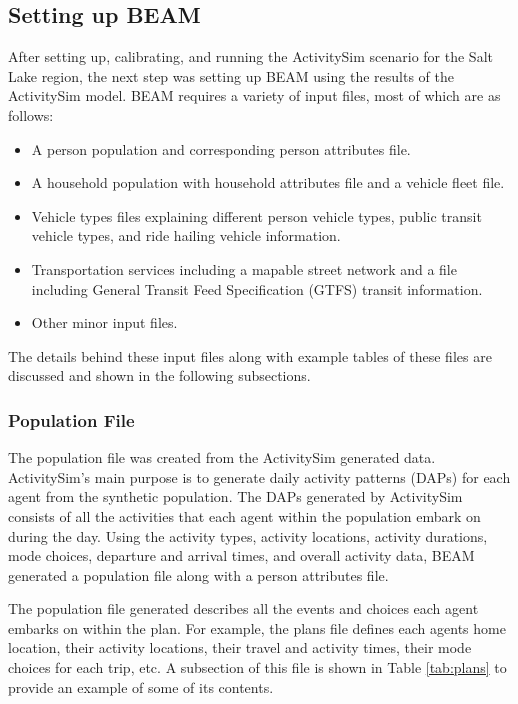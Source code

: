 \documentclass[12pt, oneside, openright]{byuthesis}
\providecommand{\tightlist}{%
  \setlength{\itemsep}{0pt}\setlength{\parskip}{0pt}}
\begin{document}
\hypertarget{setting-up-beam}{%
\subsection{Setting up BEAM}\label{setting-up-beam}}

After setting up, calibrating, and running the ActivitySim scenario for the Salt Lake region, the next step was setting up BEAM using the results of the ActivitySim model. BEAM requires a variety of input files, most of which are as follows:

\begin{itemize}
\tightlist
\item
  A person population and corresponding person attributes file.
\item
  A household population with household attributes file and a vehicle fleet file.
\item
  Vehicle types files explaining different person vehicle types, public transit vehicle types, and ride hailing vehicle information.
\item
  Transportation services including a mapable street network and a file including General Transit Feed Specification (GTFS) transit information.
\item
  Other minor input files.
\end{itemize}

The details behind these input files along with example tables of these files are discussed and shown in the following subsections.

\hypertarget{population-file}{%
\subsubsection{Population File}\label{population-file}}

The population file was created from the ActivitySim generated data. ActivitySim's main purpose is to generate daily activity patterns (DAPs) for each agent from the synthetic population. The DAPs generated by ActivitySim consists of all the activities that each agent within the population embark on during the day. Using the activity types, activity locations, activity durations, mode choices, departure and arrival times, and overall activity data, BEAM generated a population file along with a person attributes file.

The population file generated describes all the events and choices each agent embarks on within the plan. For example, the plans file defines each agents home location, their activity locations, their travel and activity times, their mode choices for each trip, etc. A subsection of this file is shown in Table \ref{tab:plans} to provide an example of some of its contents.
\end{document}

